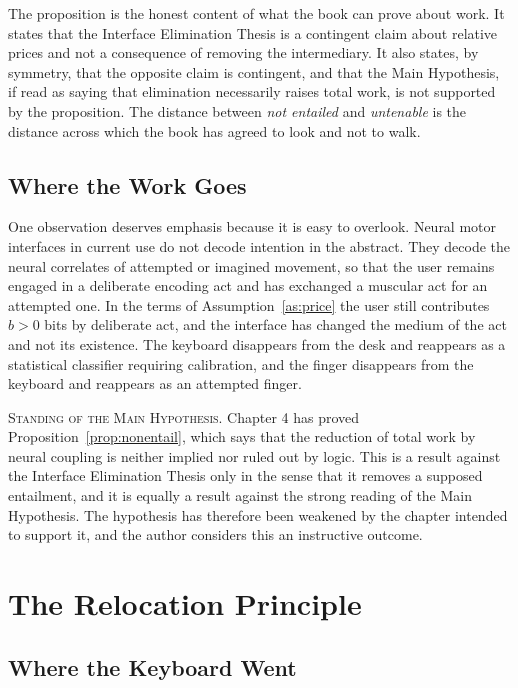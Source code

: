 \documentclass[11pt,twoside,openany]{book}
\theoremstyle{definition}
\theoremstyle{remark}
\newenvironment{standing}{\par\medskip\noindent\hrulefill\par\smallskip\noindent\textsc{Standing of the Main Hypothesis.}\enspace}{\par\smallskip\noindent\hrulefill\par\medskip}
\begin{document}
The proposition is the honest content of what the book can prove about work. It states that the Interface Elimination Thesis is a contingent claim about relative prices and not a consequence of removing the intermediary. It also states, by symmetry, that the opposite claim is contingent, and that the Main Hypothesis, if read as saying that elimination necessarily raises total work, is not supported by the proposition. The distance between \emph{not entailed} and \emph{untenable} is the distance across which the book has agreed to look and not to walk.

\section{Where the Work Goes}

One observation deserves emphasis because it is easy to overlook. Neural motor interfaces in current use do not decode intention in the abstract. They decode the neural correlates of attempted or imagined movement, so that the user remains engaged in a deliberate encoding act and has exchanged a muscular act for an attempted one. In the terms of Assumption~\ref{as:price} the user still contributes $b>0$ bits by deliberate act, and the interface has changed the medium of the act and not its existence. The keyboard disappears from the desk and reappears as a statistical classifier requiring calibration, and the finger disappears from the keyboard and reappears as an attempted finger.

\begin{standing}
Chapter 4 has proved Proposition~\ref{prop:nonentail}, which says that the reduction of total work by neural coupling is neither implied nor ruled out by logic. This is a result against the Interface Elimination Thesis only in the sense that it removes a supposed entailment, and it is equally a result against the strong reading of the Main Hypothesis. The hypothesis has therefore been weakened by the chapter intended to support it, and the author considers this an instructive outcome.
\end{standing}

\chapter{The Relocation Principle}

\section{Where the Keyboard Went}
\end{document}
